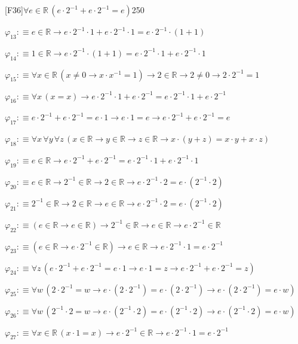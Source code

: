 \begin{fullproof}{[F36]}{$\forall e \in \mathbb{R}\,(e \cdot 2^{-1} + e \cdot 2^{-1} = e)$}{250}
\begin{abbrevlist}
\item $\varphi_{13} :\equiv e \in \mathbb{R} \to e \cdot 2^{-1} \cdot 1 + e \cdot 2^{-1} \cdot 1 = e \cdot 2^{-1} \cdot (1 + 1)$
\item $\varphi_{14} :\equiv 1 \in \mathbb{R} \to e \cdot 2^{-1} \cdot (1 + 1) = e \cdot 2^{-1} \cdot 1 + e \cdot 2^{-1} \cdot 1$
\item $\varphi_{15} :\equiv \forall x \in \mathbb{R}\,(x \neq 0 \to x \cdot x^{-1} = 1) \to 2 \in \mathbb{R} \to 2 \neq 0 \to 2 \cdot 2^{-1} = 1$
\item $\varphi_{16} :\equiv \forall x\,(x = x) \to e \cdot 2^{-1} \cdot 1 + e \cdot 2^{-1} = e \cdot 2^{-1} \cdot 1 + e \cdot 2^{-1}$
\item $\varphi_{17} :\equiv e \cdot 2^{-1} + e \cdot 2^{-1} = e \cdot 1 \to e \cdot 1 = e \to e \cdot 2^{-1} + e \cdot 2^{-1} = e$
\item $\varphi_{18} :\equiv \forall x\,\forall y\,\forall z\,(x \in \mathbb{R} \to y \in \mathbb{R} \to z \in \mathbb{R} \to x \cdot (y + z) = x \cdot y + x \cdot z)$
\item $\varphi_{19} :\equiv e \in \mathbb{R} \to e \cdot 2^{-1} + e \cdot 2^{-1} = e \cdot 2^{-1} \cdot 1 + e \cdot 2^{-1} \cdot 1$
\item $\varphi_{20} :\equiv e \in \mathbb{R} \to 2^{-1} \in \mathbb{R} \to 2 \in \mathbb{R} \to e \cdot 2^{-1} \cdot 2 = e \cdot (2^{-1} \cdot 2)$
\item $\varphi_{21} :\equiv 2^{-1} \in \mathbb{R} \to 2 \in \mathbb{R} \to e \in \mathbb{R} \to e \cdot 2^{-1} \cdot 2 = e \cdot (2^{-1} \cdot 2)$
\item $\varphi_{22} :\equiv (e \in \mathbb{R} \to e \in \mathbb{R}) \to 2^{-1} \in \mathbb{R} \to e \in \mathbb{R} \to e \cdot 2^{-1} \in \mathbb{R}$
\item $\varphi_{23} :\equiv (e \in \mathbb{R} \to e \cdot 2^{-1} \in \mathbb{R}) \to e \in \mathbb{R} \to e \cdot 2^{-1} \cdot 1 = e \cdot 2^{-1}$
\item $\varphi_{24} :\equiv \forall z\,(e \cdot 2^{-1} + e \cdot 2^{-1} = e \cdot 1 \to e \cdot 1 = z \to e \cdot 2^{-1} + e \cdot 2^{-1} = z)$
\item $\varphi_{25} :\equiv \forall w\,(2 \cdot 2^{-1} = w \to e \cdot (2 \cdot 2^{-1}) = e \cdot (2 \cdot 2^{-1}) \to e \cdot (2 \cdot 2^{-1}) = e \cdot w)$
\item $\varphi_{26} :\equiv \forall w\,(2^{-1} \cdot 2 = w \to e \cdot (2^{-1} \cdot 2) = e \cdot (2^{-1} \cdot 2) \to e \cdot (2^{-1} \cdot 2) = e \cdot w)$
\item $\varphi_{27} :\equiv \forall x \in \mathbb{R}\,(x \cdot 1 = x) \to e \cdot 2^{-1} \in \mathbb{R} \to e \cdot 2^{-1} \cdot 1 = e \cdot 2^{-1}$

\end{abbrevlist}
\end{fullproof}
